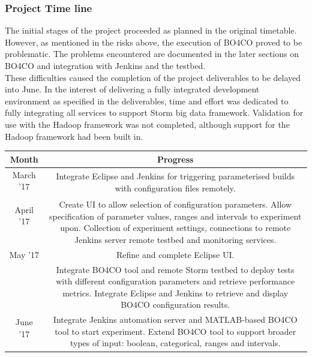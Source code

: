 \subsubsection{Project Time line}
The initial stages of the project proceeded as planned in the original timetable. However, as mentioned in the risks above, the execution of BO4CO proved to be problematic. The problems encountered are documented in the later sections on BO4CO and integration with Jenkins and the testbed.\\
These difficulties caused the completion of the project deliverables to be delayed into June. In the interest of delivering a fully integrated development environment as specified in the deliverables, time and effort was dedicated to fully integrating all services to support Storm big data framework. Validation for use with the Hadoop framework was not completed, although support for the Hadoop framework had been built in.
\begin{center}
\begin{tabular}{|c|c|}
\hline
Month & Progress\\
\hline
March '17 & \multirow{2}{*}{\parbox{12cm}{Integrate Eclipse and Jenkins for triggering parameterised builds with configuration files remotely.}}\\
&\\
\hline
April '17 & \multirow{4}{*}{\parbox{12cm}{Create UI to allow selection of configuration parameters. Allow specification of parameter values, ranges and intervals to experiment upon. Collection of experiment settings, connections to remote Jenkins server remote testbed and monitoring services.}}\\
&\\
&\\
&\\
\hline
May '17 & \multirow{1}{*}{\parbox{13cm}{Refine and complete Eclipse UI.}}\\
& \multirow{4}{*}{\parbox{12cm}{Integrate BO4CO tool and remote Storm testbed to deploy tests with different configuration parameters and retrieve performance metrics. Integrate Eclipse and Jenkins to retrieve and display BO4CO configuration results.}}\\
&\\
&\\
&\\
\hline
June '17 & \multirow{3}{*}{\parbox{12cm}{Integrate Jenkins automation server and MATLAB-based BO4CO tool to start experiment. Extend BO4CO tool to support broader types of input: boolean, categorical, ranges and intervals.}}\\
&\\
&\\
\hline
\end{tabular}
\end{center}